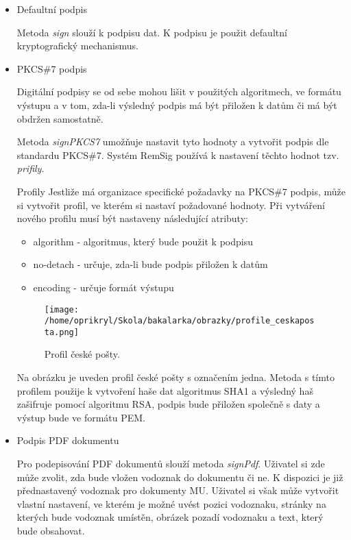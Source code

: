 \documentclass[]{fithesis3}
\begin{document}
	\begin{itemize}
	\item Defaultní podpis
		
		Metoda \textit{sign} slouží k podpisu dat. K podpisu je použit defaultní kryptografický 				mechanismus. 
	
	\item PKCS\#7 podpis

		Digitální podpisy se od sebe mohou lišit v použitých algoritmech, ve formátu výstupu a v 			tom, zda-li výsledný podpis má být přiložen k datům či má být obdržen samostatně. 		

		Metoda \textit{signPKCS7} umožňuje nastavit tyto hodnoty a vytvořit podpis dle 					standardu PKCS\#7. Systém RemSig používá k nastavení těchto hodnot tzv. 						\textit{prifily}.

		Profily \newline
		Jestliže má organizace specifické požadavky na PKCS\#7 podpis, může si vytvořit profil, ve 		kterém si nastaví požadované hodnoty. Při vytváření nového profilu musí být nastaveny 			následující atributy:

		\begin{itemize}
		\item algorithm - algoritmus, který bude použit k podpisu
		\item no-detach - určuje, zda-li bude podpis přiložen k datům
		\item encoding - určuje formát výstupu
		\end{itemize}

		\begin{figure}[!h]
  			\begin{minipage}{1.00\textwidth}
    			\texttt{[image: /home/oprikryl/Skola/bakalarka/obrazky/profile\_ceskaposta.png]}
  			\end{minipage}
 			\caption{Profil české pošty.}
  			\label{fig:Profil české pošty.}
		\end{figure}

		Na obrázku je uveden profil české pošty s označením jedna. Metoda s tímto profilem 				použije k vytvoření haše dat algoritmus SHA1 a výsledný haš zašifruje pomocí algoritmu 			RSA, podpis bude přiložen společně s daty a výstup bude ve formátu PEM.

	\item Podpis PDF dokumentu

	Pro podepisování PDF dokumentů slouží metoda \textit{signPdf}. Uživatel si zde může zvolit, 		zda bude vložen vodoznak do dokumentu či ne. K dispozici je již přednastavený vodoznak pro 		dokumenty MU. Uživatel si však může vytvořit vlastní nastavení, ve kterém je možné uvést 		pozici vodoznaku, stránky na kterých bude vodoznak umístěn, obrázek pozadí vodoznaku a 			text, který bude obsahovat.
	\end{itemize}	
\end{document}
